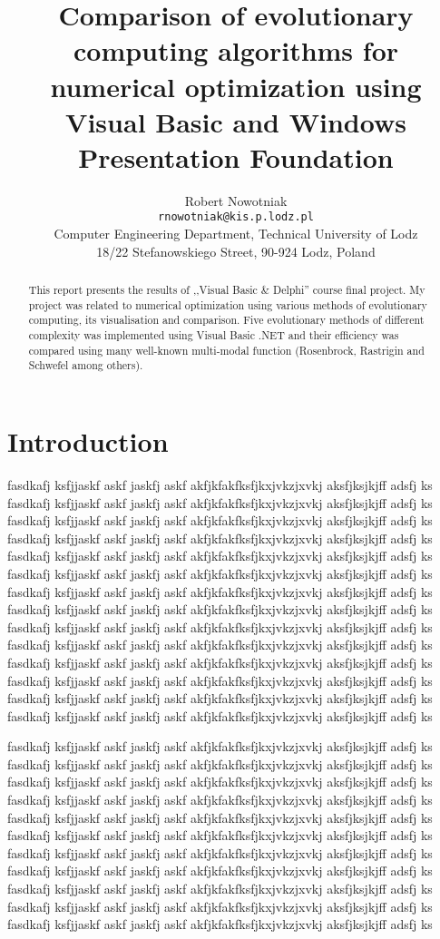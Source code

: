 \documentclass[a4paper,11pt,twocolumn]{article}
\title{Comparison of evolutionary computing algorithms for numerical
optimization using Visual Basic and Windows Presentation Foundation}
\author{Robert Nowotniak\\
\texttt{rnowotniak@kis.p.lodz.pl}\\
Computer Engineering Department, Technical University of Lodz\\
18/22 Stefanowskiego Street, 90-924 Lodz, Poland}
\begin{document}
\maketitle

\thispagestyle{empty} 
\pagestyle{empty} 

\begin{abstract}
This report presents the results of ,,Visual Basic \& Delphi'' course
final project.
My project was related to numerical optimization using various
methods of evolutionary computing, its visualisation and comparison.
Five evolutionary methods of different complexity was implemented
using Visual Basic .NET and their efficiency was compared using
many well-known multi-modal function (Rosenbrock, Rastrigin and Schwefel among
others).
\end{abstract}

\section{Introduction}

fasdkafj ksfjjaskf askf jaskfj askf akfjkfakfksfjkxjvkzjxvkj aksfjksjkjff adsfj ks
fasdkafj ksfjjaskf askf jaskfj askf akfjkfakfksfjkxjvkzjxvkj aksfjksjkjff adsfj ks
fasdkafj ksfjjaskf askf jaskfj askf akfjkfakfksfjkxjvkzjxvkj aksfjksjkjff adsfj ks
fasdkafj ksfjjaskf askf jaskfj askf akfjkfakfksfjkxjvkzjxvkj aksfjksjkjff adsfj ks
fasdkafj ksfjjaskf askf jaskfj askf akfjkfakfksfjkxjvkzjxvkj aksfjksjkjff adsfj ks
fasdkafj ksfjjaskf askf jaskfj askf akfjkfakfksfjkxjvkzjxvkj aksfjksjkjff adsfj ks
fasdkafj ksfjjaskf askf jaskfj askf akfjkfakfksfjkxjvkzjxvkj aksfjksjkjff adsfj ks
fasdkafj ksfjjaskf askf jaskfj askf akfjkfakfksfjkxjvkzjxvkj aksfjksjkjff adsfj ks
fasdkafj ksfjjaskf askf jaskfj askf akfjkfakfksfjkxjvkzjxvkj aksfjksjkjff adsfj ks
fasdkafj ksfjjaskf askf jaskfj askf akfjkfakfksfjkxjvkzjxvkj aksfjksjkjff adsfj ks
fasdkafj ksfjjaskf askf jaskfj askf akfjkfakfksfjkxjvkzjxvkj aksfjksjkjff adsfj ks
fasdkafj ksfjjaskf askf jaskfj askf akfjkfakfksfjkxjvkzjxvkj aksfjksjkjff adsfj ks
fasdkafj ksfjjaskf askf jaskfj askf akfjkfakfksfjkxjvkzjxvkj aksfjksjkjff adsfj ks
fasdkafj ksfjjaskf askf jaskfj askf akfjkfakfksfjkxjvkzjxvkj aksfjksjkjff adsfj ks

fasdkafj ksfjjaskf askf jaskfj askf akfjkfakfksfjkxjvkzjxvkj aksfjksjkjff adsfj ks
fasdkafj ksfjjaskf askf jaskfj askf akfjkfakfksfjkxjvkzjxvkj aksfjksjkjff adsfj ks
fasdkafj ksfjjaskf askf jaskfj askf akfjkfakfksfjkxjvkzjxvkj aksfjksjkjff adsfj ks
fasdkafj ksfjjaskf askf jaskfj askf akfjkfakfksfjkxjvkzjxvkj aksfjksjkjff adsfj ks
fasdkafj ksfjjaskf askf jaskfj askf akfjkfakfksfjkxjvkzjxvkj aksfjksjkjff adsfj ks
fasdkafj ksfjjaskf askf jaskfj askf akfjkfakfksfjkxjvkzjxvkj aksfjksjkjff adsfj ks
fasdkafj ksfjjaskf askf jaskfj askf akfjkfakfksfjkxjvkzjxvkj aksfjksjkjff adsfj ks
fasdkafj ksfjjaskf askf jaskfj askf akfjkfakfksfjkxjvkzjxvkj aksfjksjkjff adsfj ks
fasdkafj ksfjjaskf askf jaskfj askf akfjkfakfksfjkxjvkzjxvkj aksfjksjkjff adsfj ks
fasdkafj ksfjjaskf askf jaskfj askf akfjkfakfksfjkxjvkzjxvkj aksfjksjkjff adsfj ks
fasdkafj ksfjjaskf askf jaskfj askf akfjkfakfksfjkxjvkzjxvkj aksfjksjkjff adsfj ks
\end{document}
